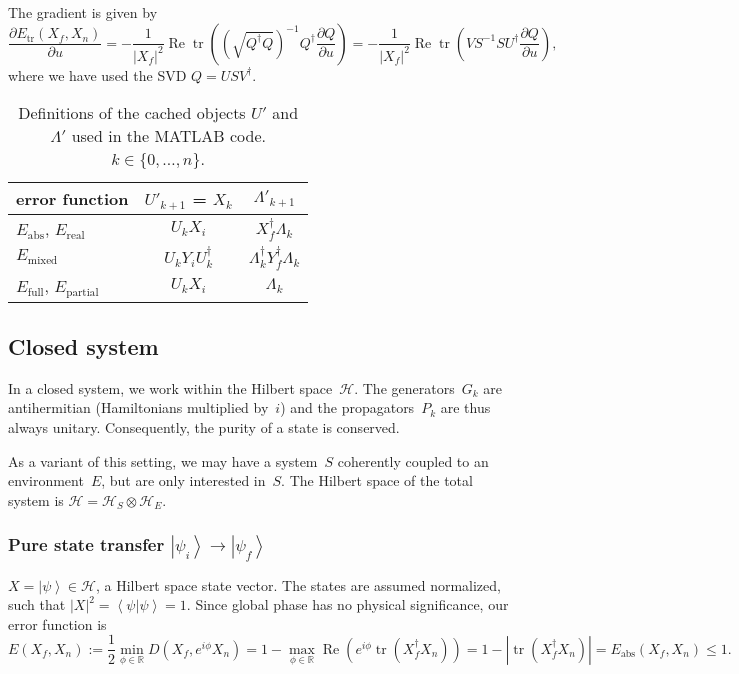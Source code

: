 \documentclass[aps, pra, a4paper, longbibliography]{revtex4}
\newcommand{\be}{\begin{equation}}
\newcommand{\ee}{\end{equation}}
\newcommand{\R}{{\mathbb R}}  %
\newcommand{\ket}[1]{\left| #1 \right \rangle}
\newcommand{\braket}[2]{\left \langle #1 | #2 \right \rangle}
\newcommand{\hilb}[1]{\mathcal{#1}}
\DeclareMathOperator{\tr}{tr}
\DeclareMathOperator{\re}{Re}
\newcommand{\dd}[2]{\frac{\partial #1}{\partial #2}}
\begin{document}
The gradient is given by
\be
\dd{E_\text{tr}(X_f, X_n)}{u}
= -\frac{1}{|X_f|^2} \re \tr \left(\left(\sqrt{Q^\dagger Q}\right)^{-1} Q^\dagger \dd{Q}{u}\right)
= -\frac{1}{|X_f|^2} \re \tr \left(V S^{-1} S U^\dagger \dd{Q}{u}\right),
\ee
where we have used the SVD $Q = U S V^\dagger$.



\begin{table}
\begin{tabular}{l|c|c}
error function & $U'_{k+1}$ = $X_k$ & $\Lambda'_{k+1}$\\
\hline
$E_\text{abs}$, $E_\text{real}$ & $U_k X_i$ & $X_f^\dagger \Lambda_k$\\
$E_\text{mixed}$ & $U_k Y_i U_k^\dagger$ & $\Lambda_k^\dagger Y_f^\dagger \Lambda_k$\\
$E_\text{full}$, $E_\text{partial}$ & $U_k X_i$ & $\Lambda_k$
\end{tabular}
\caption{Definitions of the cached objects $U'$ and $\Lambda'$ used in the MATLAB
  code. $k \in \{0, \ldots, n\}$.}
\label{table:UL}
\end{table}


\subsection{Closed system}

In a closed system, we work within the Hilbert space~$\hilb{H}$.
The generators~$G_k$ are antihermitian (Hamiltonians multiplied by~$i$)
and the propagators~$P_k$ are thus always
unitary. Consequently, the purity of a state is conserved.

As a variant of this setting,
we may have a system~$S$ coherently coupled to an
environment~$E$, but are only interested in~$S$.
The Hilbert space of the total system is
$\hilb{H} = \hilb{H}_S \otimes \hilb{H}_E$.


\subsubsection{Pure state transfer $\ket{\psi_i} \to \ket{\psi_f}$}
\label{sec:closed-pure}

$X = \ket{\psi} \in \hilb{H}$, a Hilbert space state vector.
The states are assumed normalized, such that $|X|^2 = \braket{\psi}{\psi} = 1$.
Since global phase has no physical significance, our error function is
\be
E(X_f, X_n) := \frac{1}{2} \min_{\phi \in \R} D(X_f, e^{i \phi} X_n)
= 1 -\max_{\phi \in \R} \re \left( e^{i \phi} \tr(X_f^\dagger X_n)\right)
= 1 -|\tr(X_f^\dagger X_n)|
= E_\text{abs}(X_f, X_n) \le 1.
\ee
\end{document}
